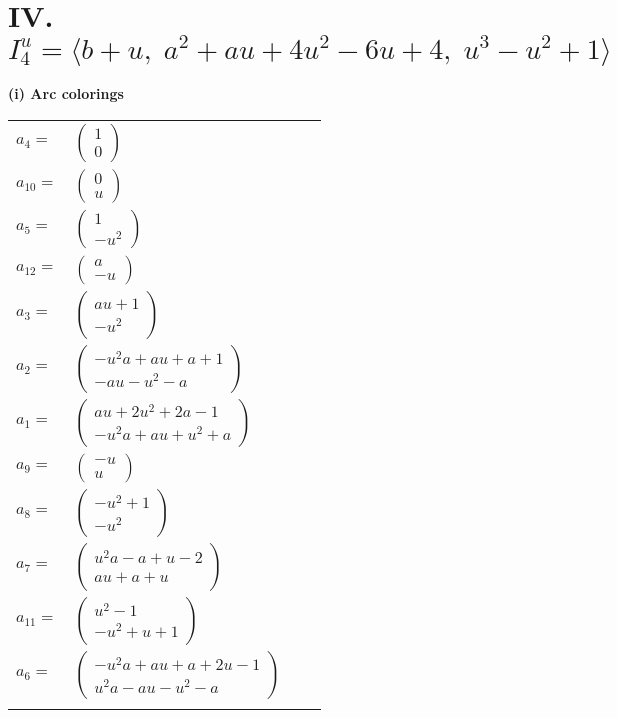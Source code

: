 \documentclass[1p]{elsarticle_modified}
\theoremstyle{definition}
\begin{document}
\centering \section*{IV. $I^u_{4}= \langle b+u,\;a^2+a u+4 u^2-6 u+4,\;u^3- u^2+1 \rangle$}
\flushleft \textbf{(i) Arc colorings}\\
\begin{tabular}{m{7pt} m{180pt} m{7pt} m{180pt} }
\flushright $a_{4}=$&$\begin{pmatrix}1\\0\end{pmatrix}$ \\
\flushright $a_{10}=$&$\begin{pmatrix}0\\u\end{pmatrix}$ \\
\flushright $a_{5}=$&$\begin{pmatrix}1\\- u^2\end{pmatrix}$ \\
\flushright $a_{12}=$&$\begin{pmatrix}a\\- u\end{pmatrix}$ \\
\flushright $a_{3}=$&$\begin{pmatrix}a u+1\\- u^2\end{pmatrix}$ \\
\flushright $a_{2}=$&$\begin{pmatrix}- u^2 a+a u+a+1\\- a u- u^2- a\end{pmatrix}$ \\
\flushright $a_{1}=$&$\begin{pmatrix}a u+2 u^2+2 a-1\\- u^2 a+a u+u^2+a\end{pmatrix}$ \\
\flushright $a_{9}=$&$\begin{pmatrix}- u\\u\end{pmatrix}$ \\
\flushright $a_{8}=$&$\begin{pmatrix}- u^2+1\\- u^2\end{pmatrix}$ \\
\flushright $a_{7}=$&$\begin{pmatrix}u^2 a- a+u-2\\a u+a+u\end{pmatrix}$ \\
\flushright $a_{11}=$&$\begin{pmatrix}u^2-1\\- u^2+u+1\end{pmatrix}$ \\
\flushright $a_{6}=$&$\begin{pmatrix}- u^2 a+a u+a+2 u-1\\u^2 a- a u- u^2- a\end{pmatrix}$\\&\end{tabular}
\end{document}
